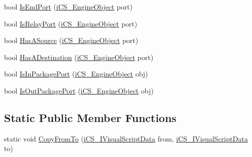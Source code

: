 \begin{DoxyCompactItemize}
\item 
bool \hyperlink{classi_c_s___storage_imp_aa72f7db7acf1323b3cf6679863f366c6}{Is\+End\+Port} (\hyperlink{classi_c_s___engine_object}{i\+C\+S\+\_\+\+Engine\+Object} port)
\item 
bool \hyperlink{classi_c_s___storage_imp_ab480d28484defd9bbd8b5bd7943e6659}{Is\+Relay\+Port} (\hyperlink{classi_c_s___engine_object}{i\+C\+S\+\_\+\+Engine\+Object} port)
\item 
bool \hyperlink{classi_c_s___storage_imp_a0e70af34badd23c04238c76a73f87b09}{Has\+A\+Source} (\hyperlink{classi_c_s___engine_object}{i\+C\+S\+\_\+\+Engine\+Object} port)
\item 
bool \hyperlink{classi_c_s___storage_imp_a5ad1fca74f1113ed258fdca3d15b61c4}{Has\+A\+Destination} (\hyperlink{classi_c_s___engine_object}{i\+C\+S\+\_\+\+Engine\+Object} port)
\item 
bool \hyperlink{classi_c_s___storage_imp_a4779e91ed4adf5bc7ad38247cbc43764}{Is\+In\+Package\+Port} (\hyperlink{classi_c_s___engine_object}{i\+C\+S\+\_\+\+Engine\+Object} obj)
\item 
bool \hyperlink{classi_c_s___storage_imp_a2132fdd9fb38370086464997fbe4ffff}{Is\+Out\+Package\+Port} (\hyperlink{classi_c_s___engine_object}{i\+C\+S\+\_\+\+Engine\+Object} obj)
\end{DoxyCompactItemize}
\subsection*{Static Public Member Functions}
\begin{DoxyCompactItemize}
\item 
static void \hyperlink{classi_c_s___storage_imp_a688f054a95afd7a6af4a72aa563eaa98}{Copy\+From\+To} (\hyperlink{interfacei_c_s___i_visual_script_data}{i\+C\+S\+\_\+\+I\+Visual\+Script\+Data} from, \hyperlink{interfacei_c_s___i_visual_script_data}{i\+C\+S\+\_\+\+I\+Visual\+Script\+Data} to)
\end{DoxyCompactItemize}
